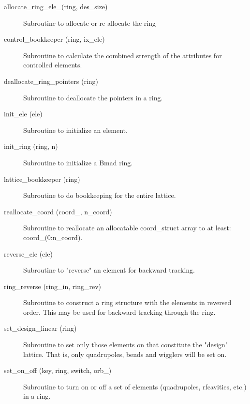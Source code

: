 \begin{description}

\item[allocate\_ring\_ele\_(ring, des\_size)] \Newline 
Subroutine to allocate or re-allocate the ring%

\item[control\_bookkeeper (ring, ix\_ele)] \Newline
Subroutine to calculate the combined strength of the attributes for
controlled elements.

\item[deallocate\_ring\_pointers (ring)] \Newline 
Subroutine to deallocate the pointers in a ring.

\item[init\_ele (ele)] \Newline
Subroutine to initialize an element. 

\item[init\_ring (ring, n)] \Newline 
Subroutine to initialize a Bmad ring.

\item[lattice\_bookkeeper (ring)] \Newline 
Subroutine to do bookkeeping for the entire lattice.

\item[reallocate\_coord (coord\_, n\_coord)] \Newline 
Subroutine to reallocate an allocatable  coord\_struct array to at least:
coord\_(0:n\_coord).

\item[reverse\_ele (ele)] \Newline
Subroutine to "reverse" an element for backward tracking. 

\item[ring\_reverse (ring\_in, ring\_rev)] \Newline
Subroutine to construct a ring structure with the elements in reversed 
order. This may be used for backward tracking through the ring. 

\item[set\_design\_linear (ring)] \Newline
Subroutine to set only those elements on that constitute the "design" 
lattice. That is, only quadrupoles, bends and wigglers will be set on. 

\item[set\_on\_off (key, ring, switch, orb\_)] \Newline
Subroutine to turn on or off a set of elements (quadrupoles,
rfcavities, etc.) in a ring.


\end{description}
